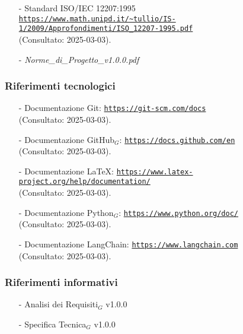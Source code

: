 \documentclass[10pt]{article}
\begin{document}
\begin{justify}
\begin{itemize}
    \item[-] Standard ISO/IEC 12207:1995 \\ 
    \textcolor{blue}{\texttt{\url{https://www.math.unipd.it/~tullio/IS-1/2009/Approfondimenti/ISO_12207-1995.pdf}}} \\
    (Consultato: 2025-03-03).
    
    \item[-] \textit{Norme\_di\_Progetto\_v1.0.0.pdf}
\end{itemize}

\subsubsection{Riferimenti tecnologici}
\begin{itemize}
    \item[-] Documentazione Git: \textcolor{blue}{\texttt{\url{https://git-scm.com/docs}}} \\
    (Consultato: 2025-03-03).
    
    \item[-] Documentazione GitHub$_G$: \textcolor{blue}{\texttt{\url{https://docs.github.com/en}}} \\
    (Consultato: 2025-03-03).
    
    \item[-] Documentazione \LaTeX: \textcolor{blue}{\texttt{\url{https://www.latex-project.org/help/documentation/}}} \\
    (Consultato: 2025-03-03).
    
    \item[-] Documentazione Python$_G$: \textcolor{blue}{\texttt{\url{https://www.python.org/doc/}}} \\
    (Consultato: 2025-03-03).
    
    \item[-] Documentazione LangChain: \textcolor{blue}{\texttt{\url{https://www.langchain.com}}} \\
    (Consultato: 2025-03-03).
\end{itemize}

\subsubsection{Riferimenti informativi}
\begin{itemize}
    \item[-] Analisi dei Requisiti$_G$ v1.0.0
    \item[-] Specifica Tecnica$_G$ v1.0.0
\end{itemize}



\end{justify}
\end{document}
